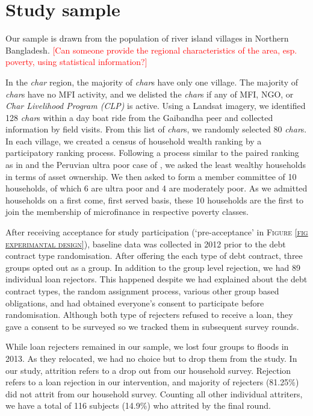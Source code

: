 \section{Study sample}
\label{SecStudySample}

	Our sample is drawn from the population of river island villages in Northern Bangladesh. 
	\textcolor{red}{[Can someone provide the regional characteristics of the area, esp. poverty, using statistical information?]}
	
	In the \textit{char} region, the majority of \textit{char}s have only one village. The majority of \textit{char}s have no MFI activity, and we delisted the \textit{char}s if any of MFI, NGO, or \textit{Char Livelihood Program (CLP)} is active. Using a Landsat imagery, we identified 128 \textit{char}s within a day boat ride from the Gaibandha peer and collected information by field visits. From this list of \textit{char}s, we randomly selected 80 \textit{char}s. In each village, we created a census of household wealth ranking by a participatory ranking process. Following a process similar to the paired ranking as in \citet[][p.1212]{Alatas2012} and the Peruvian ultra poor case of \citet[][p.66]{KarlanThuysbaert2019}, we asked the least wealthy households in terms of asset ownership. We then asked to form a member committee of 10 households, of which 6 are ultra poor and 4 are moderately poor.  As we admitted households on a first come, first served basis, these 10 households are the first to join the membership of microfinance in respective poverty classes. %
	
	After receiving acceptance for study participation (`pre-acceptance' in \textsc{\normalsize Figure \ref{fig experimantal design}}), baseline data was collected in 2012 prior to the debt contract type randomisation. After offering the each type of debt contract, three groups opted out as a group. In addition to the group level rejection, we had 89 individual loan rejectors. This happened despite we had explained about the debt contract types, the random assignment process, various other group based obligations, and had obtained everyone's consent to participate before randomisation. Although both type of rejecters refused to receive a loan, they gave a consent to be surveyed so we tracked them in subsequent survey rounds. 
	
	While loan rejecters remained in our sample, we lost four groups to floods in 2013. As they relocated, we had no choice but to drop them from the study. In our study, attrition refers to a drop out from our household survey. Rejection refers to a loan rejection in our intervention, and majority of rejecters (81.25\%) did not attrit from our household survey. Counting all other individual attriters, we have a total of 116 subjects (14.9\%) who attrited by the final round. 
	
